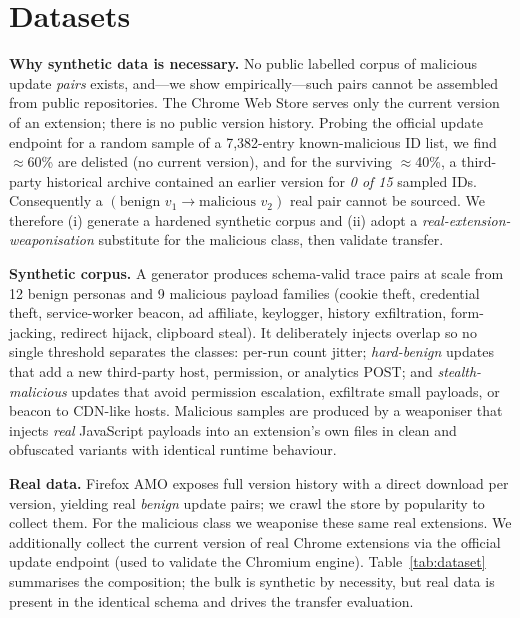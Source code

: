 \documentclass[conference]{IEEEtran}
\begin{document}
\section{Datasets}
\label{sec:data}
\noindent\textbf{Why synthetic data is necessary.} No public labelled corpus of malicious update
\emph{pairs} exists, and---we show empirically---such pairs cannot be assembled from public
repositories. The Chrome Web Store serves only the current version of an extension; there is no
public version history. Probing the official update endpoint for a random sample of a
7{,}382-entry known-malicious ID list, we find $\approx$60\% are delisted (no current version), and
for the surviving $\approx$40\%, a third-party historical archive contained an earlier version for
\emph{0 of 15} sampled IDs. Consequently a $(\text{benign }v_1 \rightarrow \text{malicious }v_2)$
real pair cannot be sourced. We therefore (i) generate a hardened synthetic corpus and (ii) adopt
a \emph{real-extension-weaponisation} substitute for the malicious class, then validate transfer.

\noindent\textbf{Synthetic corpus.} A generator produces schema-valid trace pairs at scale from 12
benign personas and 9 malicious payload families (cookie theft, credential theft, service-worker
beacon, ad affiliate, keylogger, history exfiltration, form-jacking, redirect hijack, clipboard
steal). It deliberately injects overlap so no single threshold separates the classes: per-run
count jitter; \emph{hard-benign} updates that add a new third-party host, permission, or analytics
POST; and \emph{stealth-malicious} updates that avoid permission escalation, exfiltrate small
payloads, or beacon to CDN-like hosts. Malicious samples are produced by a weaponiser that injects
\emph{real} JavaScript payloads into an extension's own files in clean and obfuscated variants
with identical runtime behaviour.

\noindent\textbf{Real data.} Firefox AMO exposes full version history with a direct download per
version, yielding real \emph{benign} update pairs; we crawl the store by popularity to collect
them. For the malicious class we weaponise these same real extensions. We additionally collect the
current version of real Chrome extensions via the official update endpoint (used to validate the
Chromium engine). Table~\ref{tab:dataset} summarises the composition; the bulk is synthetic by
necessity, but real data is present in the identical schema and drives the transfer evaluation.
\end{document}
